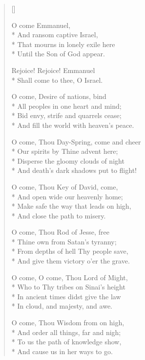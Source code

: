 \newHymn
{}

\begin{verse}[\versewidth]

 O come Emmanuel,\\*
And ransom captive Israel,\\*
That mourns in lonely exile here\\*
Until the Son of God appear.
\pointorig

Rejoice! Rejoice! Emmanuel\\*
Shall come to thee, O Israel.


 O come, Desire of nations, bind\\*
    All peoples in one heart and mind;\\*
    Bid envy, strife and quarrels cease;\\*
    And fill the world with heaven's peace.
 

 O come, Thou Day-Spring, come and cheer\\*
Our spirits by Thine advent here;\\*
Disperse the gloomy clouds of night\\*
And death's dark shadows put to flight!

 O come, Thou Key of David, come,\\*
And open wide our heavenly home;\\*
Make safe the way that leads on high,\\*
And close the path to misery. 

 O come, Thou Rod of Jesse, free\\*
Thine own from Satan's tyranny;\\*
From depths of hell Thy people save,\\*
And give them victory o'er the grave.

 O come, O come, Thou Lord of Might,\\*
Who to Thy tribes on Sinai's height\\*
In ancient times didst give the law\\*
In cloud, and majesty, and awe.


 O come, Thou Wisdom from on high,\\*
    And order all things, far and nigh;\\*
    To us the path of knowledge show,\\*
    And cause us in her ways to go.


\end{verse}
